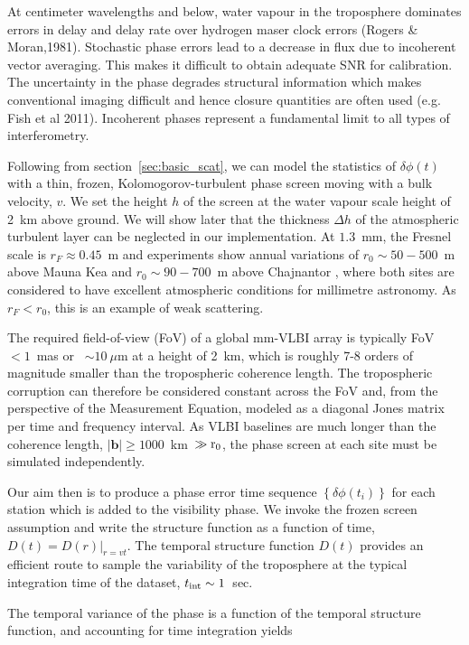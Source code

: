 At centimeter wavelengths and below, water vapour in the troposphere dominates errors in delay and delay rate over hydrogen maser clock errors (Rogers \& Moran,1981). Stochastic phase errors lead to a decrease in flux due to incoherent vector averaging. This makes it difficult to obtain adequate SNR for calibration. The uncertainty in the phase degrades structural information which makes conventional imaging difficult and hence closure quantities are often used (e.g. Fish et al 2011). Incoherent phases represent a fundamental limit to all types of interferometry. 

Following from section~\ref{sec:basic_scat}, we can model the statistics of $\delta \phi(t)$ with a thin, frozen, Kolomogorov-turbulent phase screen moving with a bulk velocity, $v$.  We set the height $h$ of the screen at the water vapour scale height of 2~km above ground. We will show later that the thickness $\Delta h$ of the atmospheric turbulent layer can be neglected in our implementation. At $1.3$~mm, the Fresnel scale is $r_F \approx 0.45$~m and experiments show annual variations of $r_0 \sim 50 - 500$~m above Mauna Kea \citep{Masson_1994} and $r_0 \sim 90 - 700$~m above Chajnantor \citep*{Radford_1998}, where both sites are considered to have excellent atmospheric conditions for millimetre astronomy. As $r_F < r_0$, this is an example of weak scattering. 


The required field-of-view (FoV) of a global mm-VLBI array is typically FoV~$< 1$~mas or ~$\sim10~\mu$m at a height of 2~km, which is roughly 7-8 orders of magnitude smaller than the tropospheric coherence length. The tropospheric corruption can therefore be considered constant across the FoV and, from the perspective of the Measurement Equation, modeled as a diagonal Jones matrix per time and frequency interval. As VLBI baselines are much longer than the coherence length, $|\mathbf{b}| \ge 1000$~km~$\gg \rm r_0$, the phase screen at each site must be simulated independently.

Our aim then is to produce a phase error time sequence $\left\{\delta \phi(t_i)\right\}$ for each station which is added to the visibility phase. We invoke the frozen screen assumption and write the structure function as a function of time, $D (t) =  D(r)|_{r=vt}$. The temporal structure function $D(t)$ provides an efficient route to sample the variability of the troposphere at the typical integration time of the dataset, $t_{\rm int} \sim 1$~sec. 

The temporal variance of the phase is a function of the temporal structure function, and accounting for time integration yields \citep*[see][B3]{Treuhaft_1987} 

